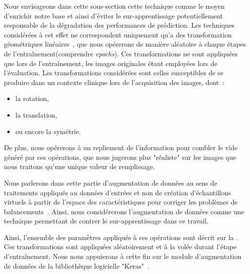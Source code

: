 Nous envisageons dans cette sous-section cette technique comme le moyen d'enrichir notre base et ainsi d'éviter le sur-apprentissage potentiellement responsable de la dégradation des performances de prédiction. Les techniques considérées à cet effet ne correspondent uniquement qu'a des transformation géométriques linéaires~\cite{Taylor2018}, que nous opérerons de manière aléatoire à chaque étapes de l'entraînement(comprendre \textit{epochs}). Ces transformations ne sont appliquées que lors de l'entraînement, les images originales étant employées lors de l'évaluation. Les transformations considérées sont celles susceptibles de se produire dans un contexte clinique lors de l'acquisition des images, dont~:
\begin{itemize}
    \item la rotation,
    \item la translation,
    \item ou encore la symétrie.
\end{itemize} De plus, nous opérerons à un repliement de l'information pour combler le vide généré par ces opérations, que nous jugerons plus "réaliste" sur les images que nous traitons qu'une unique valeur de remplissage.\par

Nous parlerons dans cette partie d'augmentation de données au sens de traitements appliqués au données d'entrées et non de création d'échantillons virtuels à partir de l'espace des caractéristiques pour corriger les problèmes de balancements~\cite{Wong2016}. Ainsi, nous considérerons l'augmentation de données comme une technique permettant de contrer le sur-apprentissage dans ce travail.\par

Ainsi, l'ensemble des paramètres appliqués à ces opérations sont décrit sur la . Ces transformations sont appliquées aléatoirement et à la volée durant l'étape d'entraînement. Nous nous appuierons à cette fin sur le module d'augmentation de données de la bibliothèque logicielle "Keras"~\cite{chollet2015}.\par

